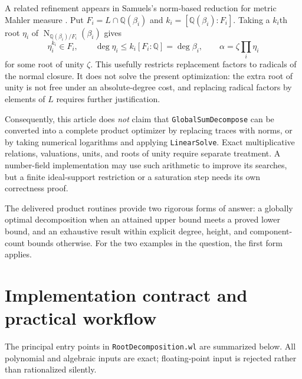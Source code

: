 \documentclass[11pt,a4paper]{article}
\newcommand{\Q}{\mathbb Q}
\newcommand{\Nm}{\operatorname{N}}
\newcommand{\code}[1]{\texttt{#1}}
\theoremstyle{definition}
\theoremstyle{remark}
\begin{document}
A related refinement appears in Samuels's norm-based reduction for metric Mahler measure \cite{samuels}. Put $F_i=L\cap\Q(\beta_i)$ and $k_i=[\Q(\beta_i):F_i]$. Taking a $k_i$th root $\eta_i$ of $\Nm_{\Q(\beta_i)/F_i}(\beta_i)$ gives
\[
 \eta_i^{k_i}\in F_i,\qquad \deg\eta_i\leq k_i[F_i:\Q]=\deg\beta_i,
 \qquad \alpha=\zeta\prod_i\eta_i
\]
for some root of unity $\zeta$. This usefully restricts replacement factors to radicals of the normal closure. It does not solve the present optimization: the extra root of unity is not free under an absolute-degree cost, and replacing radical factors by elements of $L$ requires further justification.

Consequently, this article does \emph{not} claim that \code{GlobalSumDecompose} can be converted into a complete product optimizer by replacing traces with norms, or by taking numerical logarithms and applying \code{LinearSolve}. Exact multiplicative relations, valuations, units, and roots of unity require separate treatment. A number-field implementation may use such arithmetic to improve its searches, but a finite ideal-support restriction or a saturation step needs its own correctness proof.

The delivered product routines provide two rigorous forms of answer: a globally optimal decomposition when an attained upper bound meets a proved lower bound, and an exhaustive result within explicit degree, height, and component-count bounds otherwise. For the two examples in the question, the first form applies.

\section{Implementation contract and practical workflow}
\label{sec:workflow}
The principal entry points in \code{RootDecomposition.wl} are summarized below. All polynomial and algebraic inputs are exact; floating-point input is rejected rather than rationalized silently.
\end{document}
